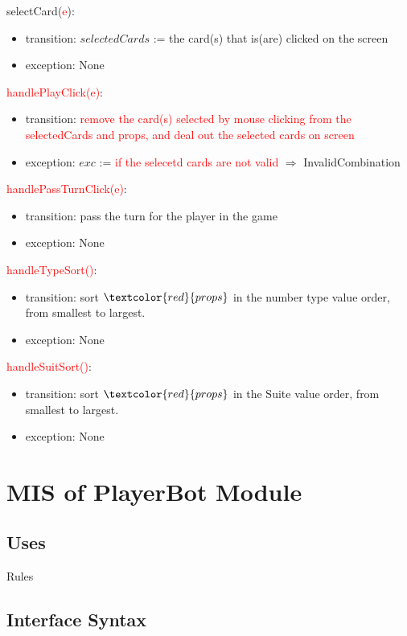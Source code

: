 \documentclass[12pt, titlepage]{article}
\begin{document}
selectCard(\textcolor{red}{e}):
\begin{itemize}
    \item transition: $selectedCards$ := the card(s) that is(are) clicked on the screen
    \item exception: None
\end{itemize}

\textcolor{red}{handlePlayClick(e)}:
\begin{itemize}
    \item transition: \textcolor{red}{remove the card(s) selected by mouse clicking from the selectedCards and props, and deal out the selected cards on screen}
    \item exception: $exc$ := \textcolor{red}{if the selecetd cards are not valid} $\Rightarrow$ InvalidCombination
\end{itemize}

\textcolor{red}{handlePassTurnClick(e)}:
\begin{itemize}
    \item transition: pass the turn for the player in the game
    \item exception: None
\end{itemize}

\textcolor{red}{handleTypeSort()}:
\begin{itemize}
    \item transition: sort $\textcolor{red}{props}$ in the number type value order, from smallest to largest.
    \item exception: None
\end{itemize}

\textcolor{red}{handleSuitSort()}:
\begin{itemize}
    \item transition: sort $\textcolor{red}{props}$ in the Suite value order, from smallest to largest.
    \item exception: None
\end{itemize}


\section{MIS of PlayerBot Module}
\subsection{Uses}
Rules
\subsection{Interface Syntax}
\end{document}
